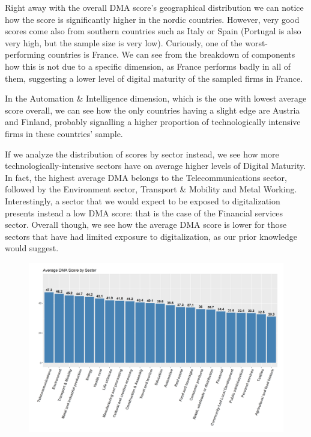 \documentclass[12pt]{report}
\begin{document}
\par Right away with the overall DMA score's geographical distribution we can notice how the score is significantly higher in the nordic countries. However, very good scores come also from southern countries such as Italy or Spain (Portugal is also very high, but the sample size is very low). Curiously, one of the worst-performing countries is France. We can see from the breakdown of components how this is not due to a specific dimension, as France performs badly in all of them, suggesting a lower level of digital maturity of the sampled firms in France.

\par In the Automation \& Intelligence dimension, which is the one with lowest average score overall, we can see how the only countries having a slight edge are Austria and Finland, probably signalling a higher proportion of technologically intensive firms in these countries' sample.

\par If we analyze the distribution of scores by sector instead, we see how more technologically-intensive sectors have on average higher levels of Digital Maturity. In fact, the highest average DMA belongs to the Telecommunications sector, followed by the Environment sector, Transport \& Mobility and Metal Working. Interestingly, a sector that we would expect to be exposed to digitalization presents instead a low DMA score: that is the case of the Financial services sector. Overall though, we see how the average DMA score is lower for those sectors that have had limited exposure to digitalization, as our prior knowledge would suggest.

\begin{figure}[h!]
    \centering
    \includegraphics[width=\linewidth]{../Output/avg_dmascore_by_sector.png}
    \caption{}
    \label{fig:dma_sector_chart}
\end{figure}
\end{document}
